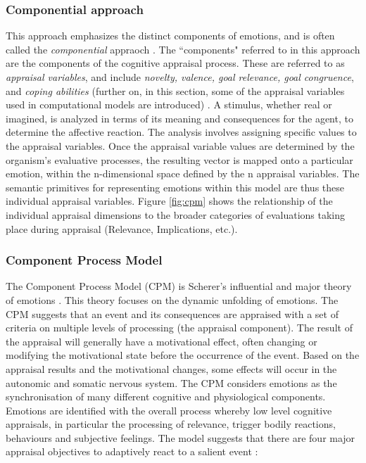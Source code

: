 \documentclass[11pt]{article}
\begin{document}
\subsubsection{Componential approach}
\label{sec:componential-theories}

This approach emphasizes the distinct components of emotions, and is often
called the \textit{componential} appraoch \cite{leventhal:emotion-cognition}.
The ``components" referred to in this approach are the components of the
cognitive appraisal process. These are referred to as \textit{appraisal
variables}, and include \textit{novelty, valence, goal relevance, goal
congruence}, and \textit{coping abilities}
(further on, in this section, some of the appraisal variables used in
computational models are introduced)
\cite{scherer:nature-function-emotion,scherer:appraisal-processes}. A stimulus,
whether real or imagined, is analyzed in terms of its meaning and consequences
for the agent, to determine the affective reaction. The analysis involves
assigning specific values to the appraisal variables. Once the appraisal
variable values are determined by the organism’s evaluative processes, the
resulting vector is mapped onto a particular emotion, within the n-dimensional
space defined by the n appraisal variables. The semantic primitives for
representing emotions within this model are thus these individual appraisal
variables. Figure \ref{fig:cpm} shows the relationship of the individual
appraisal dimensions to the broader categories of evaluations taking place
during appraisal (Relevance, Implications, etc.).

\subsubsection{Component Process Model}
\label{sec:cpm}

The Component Process Model (CPM) is Scherer's influential and major theory of
emotions
\cite{scherer:sequential-appraisal-process,scherer:appraisal-processes}. This
theory focuses on the dynamic unfolding of emotions. The CPM suggests that an
event and its consequences are appraised with a set of criteria on multiple
levels of processing (the appraisal component). The result of the appraisal will
generally have a motivational effect, often changing or modifying the
motivational state before the occurrence of the event. Based on the appraisal
results and the motivational changes, some effects will occur in the autonomic
and somatic nervous system. The CPM considers emotions as the synchronisation of
many different cognitive and physiological components. Emotions are identified
with the overall process whereby low level cognitive appraisals, in particular
the processing of relevance, trigger bodily reactions, behaviours and subjective
feelings. The model suggests that there are four major appraisal objectives to
adaptively react to a salient event \cite{scherer:dynamic-architecture-emotion}: 
\end{document}
